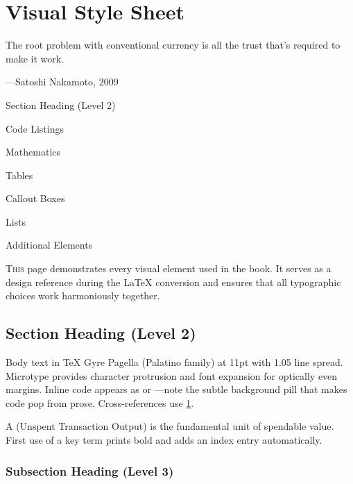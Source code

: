 \chapter{Visual Style Sheet}
\label{ch:stylesheet}

\epigraph{The root problem with conventional currency is all the trust
that's required to make it work.}{---Satoshi Nakamoto, 2009}

\begin{chapteroutline}
  \item Section Heading (Level 2)
  \item Code Listings
  \item Mathematics
  \item Tables
  \item Callout Boxes
  \item Lists
  \item Additional Elements
\end{chapteroutline}

\lettrine{T}{his} page demonstrates every visual element used in the book.
It serves as a design reference during the \LaTeX{} conversion and
ensures that all typographic choices work harmoniously together.

\section{Section Heading (Level 2)}

Body text in TeX Gyre Pagella (Palatino family) at 11pt with 1.05
line spread. Microtype provides character protrusion and font
expansion for optically even margins. Inline code appears as
 or ---note the subtle
background pill that makes code pop from prose. Cross-references
use \cref{ch:stylesheet}.

A  (Unspent Transaction Output) is the fundamental
unit of spendable value. First use of a key term prints bold and
adds an index entry automatically.

\subsection{Subsection Heading (Level 3)}

